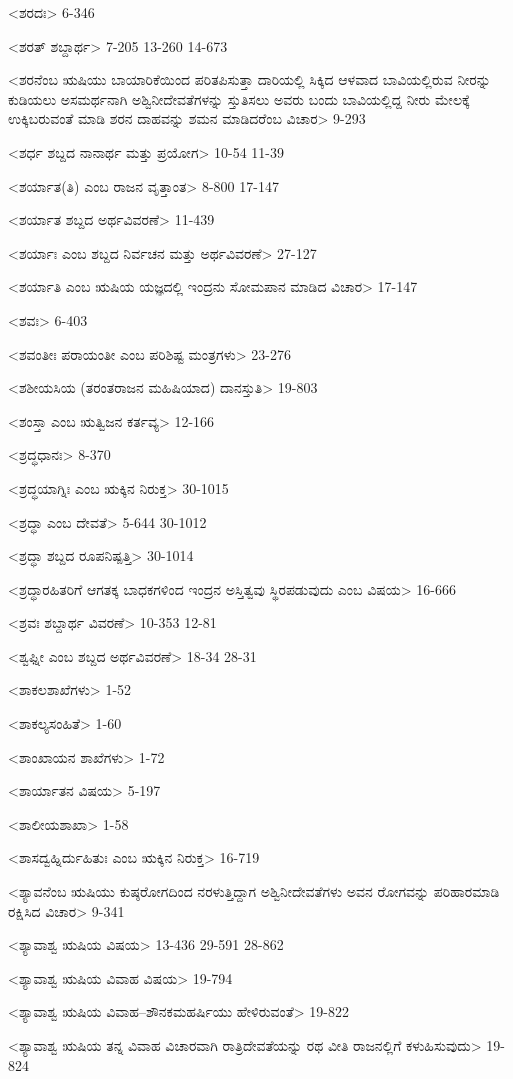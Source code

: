<ಶರದಃ>
6-346

<ಶರತ್‍ ಶಬ್ದಾರ್ಥ>
7-205
13-260
14-673


<ಶರನೆಂಬ ಋಷಿಯು ಬಾಯಾರಿಕೆಯಿಂದ ಪರಿತಪಿಸುತ್ತಾ ದಾರಿಯಲ್ಲಿ ಸಿಕ್ಕಿದ ಆಳವಾದ ಬಾವಿಯಲ್ಲಿರುವ ನೀರನ್ನು ಕುಡಿಯಲು ಅಸಮರ್ಥನಾಗಿ ಅಶ್ವಿನೀದೇವತೆಗಳನ್ನು ಸ್ತುತಿಸಲು ಅವರು ಬಂದು ಬಾವಿಯಲ್ಲಿದ್ದ ನೀರು ಮೇಲಕ್ಕೆ ಉಕ್ಕಿಬರುವಂತೆ ಮಾಡಿ ಶರನ ದಾಹವನ್ನು ಶಮನ ಮಾಡಿದರೆಂಬ ವಿಚಾರ>
9-293

<ಶರ್ಧ ಶಬ್ದದ ನಾನಾರ್ಥ ಮತ್ತು ಪ್ರಯೋಗ>
10-54
11-39

<ಶರ್ಯಾತ(ತಿ) ಎಂಬ ರಾಜನ ವೃತ್ತಾಂತ>
8-800
17-147

<ಶರ್ಯಾತ ಶಬ್ದದ ಅರ್ಥವಿವರಣೆ>
11-439

<ಶರ್ಯಾಃ ಎಂಬ ಶಬ್ದದ ನಿರ್ವಚನ ಮತ್ತು ಅರ್ಥವಿವರಣೆ>
27-127

<ಶರ್ಯಾತಿ ಎಂಬ ಋಷಿಯ ಯಜ್ಞದಲ್ಲಿ ಇಂದ್ರನು ಸೋಮಪಾನ ಮಾಡಿದ ವಿಚಾರ>
17-147

<ಶವಃ>
6-403

<ಶವಂತೀಃ ಪರಾಯಂತೀ ಎಂಬ ಪರಿಶಿಷ್ಟ ಮಂತ್ರಗಳು>
23-276

<ಶಶೀಯಸಿಯ (ತರಂತರಾಜನ ಮಹಿಷಿಯಾದ) ದಾನಸ್ತುತಿ>
19-803

<ಶಂಸ್ತಾ ಎಂಬ ಋತ್ವಿಜನ ಕರ್ತವ್ಯ>
12-166

<ಶ್ರದ್ಧಧಾನಃ>
8-370

<ಶ್ರದ್ಧಯಾಗ್ನಿಃ ಎಂಬ ಋಕ್ಕಿನ ನಿರುಕ್ತ>
30-1015

<ಶ್ರದ್ಧಾ ಎಂಬ ದೇವತೆ>
5-644
30-1012

<ಶ್ರದ್ಧಾ ಶಬ್ದದ ರೂಪನಿಷ್ಪತ್ತಿ>
30-1014

<ಶ್ರದ್ಧಾರಹಿತರಿಗೆ ಆಗತಕ್ಕ ಬಾಧಕಗಳಿಂದ ಇಂದ್ರನ ಅಸ್ತಿತ್ವವು ಸ್ಥಿರಪಡುವುದು ಎಂಬ ವಿಷಯ>
16-666

<ಶ್ರವಃ ಶಬ್ದಾರ್ಥ ವಿವರಣೆ>
10-353
12-81

<ಶ್ವಫ್ನೀ ಎಂಬ ಶಬ್ದದ ಅರ್ಥವಿವರಣೆ>
18-34
28-31

<ಶಾಕಲಶಾಖೆಗಳು>
1-52

<ಶಾಕಲ್ಯಸಂಹಿತೆ>
1-60

<ಶಾಂಖಾಯನ ಶಾಖೆಗಳು>
1-72

<ಶಾರ್ಯಾತನ ವಿಷಯ>
5-197

<ಶಾಲೀಯಶಾಖಾ>
1-58

<ಶಾಸದ್ವಹ್ನಿರ್ದುಹಿತುಃ ಎಂಬ ಋಕ್ಕಿನ ನಿರುಕ್ತ>
16-719

<ಶ್ಯಾವನೆಂಬ ಋಷಿಯು ಕುಷ್ಠರೋಗದಿಂದ ನರಳುತ್ತಿದ್ದಾಗ ಅಶ್ವಿನೀದೇವತೆಗಳು ಅವನ ರೋಗವನ್ನು ಪರಿಹಾರಮಾಡಿ ರಕ್ಷಿಸಿದ ವಿಚಾರ>
9-341

<ಶ್ಯಾವಾಶ್ವ ಋಷಿಯ ವಿಷಯ>
13-436
29-591
28-862

<ಶ್ಯಾವಾಶ್ವ ಋಷಿಯ ವಿವಾಹ ವಿಷಯ>
19-794

<ಶ್ಯಾವಾಶ್ವ ಋಷಿಯ ವಿವಾಹ–ಶೌನಕಮಹರ್ಷಿಯು ಹೇಳಿರುವಂತೆ>
19-822

<ಶ್ಯಾವಾಶ್ವ ಋಷಿಯ ತನ್ನ ವಿವಾಹ ವಿಚಾರವಾಗಿ ರಾತ್ರಿದೇವತೆಯನ್ನು ರಥ ವೀತಿ ರಾಜನಲ್ಲಿಗೆ ಕಳುಹಿಸುವುದು>
19-824

